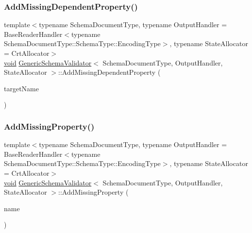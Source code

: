 \mbox{\label{classGenericSchemaValidator_a85f2be483f0ddfc402a97665aff6eca9}} 
\subsubsection{\texorpdfstring{Add\+Missing\+Dependent\+Property()}{AddMissingDependentProperty()}}
{\footnotesize\ttfamily template$<$typename Schema\+Document\+Type, typename Output\+Handler = Base\+Reader\+Handler$<$typename Schema\+Document\+Type\+::\+Schema\+Type\+::\+Encoding\+Type$>$, typename State\+Allocator = Crt\+Allocator$>$ \\
\hyperlink{imgui__impl__opengl3__loader_8h_ac668e7cffd9e2e9cfee428b9b2f34fa7}{void} \hyperlink{classGenericSchemaValidator}{Generic\+Schema\+Validator}$<$ Schema\+Document\+Type, Output\+Handler, State\+Allocator $>$\+::Add\+Missing\+Dependent\+Property (\begin{DoxyParamCaption}\item[{const \hyperlink{classGenericSchemaValidator_a3c004e35c7eb9fa5a28c0ccfb8ac62dc}{S\+Value} \&}]{target\+Name }\end{DoxyParamCaption})\hspace{0.3cm}{\ttfamily [inline]}}

\mbox{\label{classGenericSchemaValidator_a8d355eeb25364e414d9a2f8121aa0eaa}} 
\subsubsection{\texorpdfstring{Add\+Missing\+Property()}{AddMissingProperty()}}
{\footnotesize\ttfamily template$<$typename Schema\+Document\+Type, typename Output\+Handler = Base\+Reader\+Handler$<$typename Schema\+Document\+Type\+::\+Schema\+Type\+::\+Encoding\+Type$>$, typename State\+Allocator = Crt\+Allocator$>$ \\
\hyperlink{imgui__impl__opengl3__loader_8h_ac668e7cffd9e2e9cfee428b9b2f34fa7}{void} \hyperlink{classGenericSchemaValidator}{Generic\+Schema\+Validator}$<$ Schema\+Document\+Type, Output\+Handler, State\+Allocator $>$\+::Add\+Missing\+Property (\begin{DoxyParamCaption}\item[{const \hyperlink{classGenericSchemaValidator_a3c004e35c7eb9fa5a28c0ccfb8ac62dc}{S\+Value} \&}]{name }\end{DoxyParamCaption})\hspace{0.3cm}{\ttfamily [inline]}}

